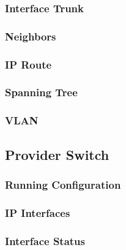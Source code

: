 \subsubsection{Interface Trunk}
%

\subsubsection{Neighbors}


\subsubsection{IP Route}
%

\subsubsection{Spanning Tree}
%

\subsubsection{VLAN}
%




\subsection{Provider Switch}
\subsubsection{Running Configuration}


\subsubsection{IP Interfaces}


\subsubsection{Interface Status}


